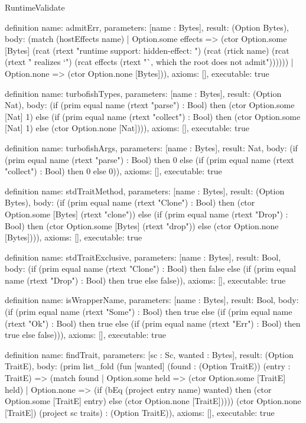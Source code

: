 \begin{lexlean}{RuntimeValidate}
\begin{semanticmodule}
definition{
  name: admitErr,
  parameters: [name : Bytes],
  result: (Option Bytes),
  body: (match (hostEffects name)
    | Option.some effects => (ctor Option.some [Bytes] (rcat (rtext "runtime support: hidden-effect: ") (rcat (rtick name) (rcat (rtext " realizes `") (rcat effects (rtext "`, which the root does not admit"))))))
    | Option.none => (ctor Option.none [Bytes])),
  axioms: [],
  executable: true
}

definition{
  name: turbofishTypes,
  parameters: [name : Bytes],
  result: (Option Nat),
  body: (if (prim equal name (rtext "parse") : Bool) then (ctor Option.some [Nat] 1) else (if (prim equal name (rtext "collect") : Bool) then (ctor Option.some [Nat] 1) else (ctor Option.none [Nat]))),
  axioms: [],
  executable: true
}

definition{
  name: turbofishArgs,
  parameters: [name : Bytes],
  result: Nat,
  body: (if (prim equal name (rtext "parse") : Bool) then 0 else (if (prim equal name (rtext "collect") : Bool) then 0 else 0)),
  axioms: [],
  executable: true
}

definition{
  name: stdTraitMethod,
  parameters: [name : Bytes],
  result: (Option Bytes),
  body: (if (prim equal name (rtext "Clone") : Bool) then (ctor Option.some [Bytes] (rtext "clone")) else (if (prim equal name (rtext "Drop") : Bool) then (ctor Option.some [Bytes] (rtext "drop")) else (ctor Option.none [Bytes]))),
  axioms: [],
  executable: true
}

definition{
  name: stdTraitExclusive,
  parameters: [name : Bytes],
  result: Bool,
  body: (if (prim equal name (rtext "Clone") : Bool) then false else (if (prim equal name (rtext "Drop") : Bool) then true else false)),
  axioms: [],
  executable: true
}

definition{
  name: isWrapperName,
  parameters: [name : Bytes],
  result: Bool,
  body: (if (prim equal name (rtext "Some") : Bool) then true else (if (prim equal name (rtext "Ok") : Bool) then true else (if (prim equal name (rtext "Err") : Bool) then true else false))),
  axioms: [],
  executable: true
}

definition{
  name: findTrait,
  parameters: [sc : Sc, wanted : Bytes],
  result: (Option TraitE),
  body: (prim list_fold (fun [wanted] (found : (Option TraitE)) (entry : TraitE) => (match found
    | Option.some held => (ctor Option.some [TraitE] held)
    | Option.none => (if (bEq (project entry name) wanted) then (ctor Option.some [TraitE] entry) else (ctor Option.none [TraitE])))) (ctor Option.none [TraitE]) (project sc traits) : (Option TraitE)),
  axioms: [],
  executable: true
}


\end{semanticmodule}
\end{lexlean}
